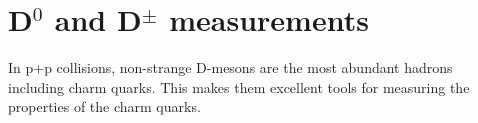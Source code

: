% 
% 
% 


\section{D$^0$ and D$^\pm$ measurements}
In p+p collisions, non-strange D-mesons are the most abundant hadrons including charm quarks. This makes them excellent tools for measuring the properties of the charm quarks. 

